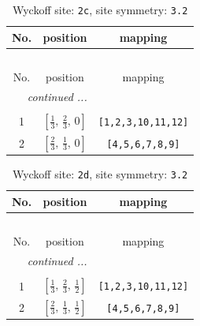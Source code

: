 \documentclass[fleqn,8pt]{jsarticle}
\begin{document}
\begin{longtable}{ccc}
\caption{Wyckoff site: {\tt 2c}, site symmetry: {\tt 3.2}}
 \\
 \hline \hline
No. & position & mapping \\ \hline \endfirsthead

\multicolumn{2}{l}{\tablename\ \thetable{}} \\
 \hline \hline
No. & position & mapping \\ \hline \endhead

 \hline \hline
\multicolumn{2}{r}{\footnotesize\it continued ...} \\ \endfoot

 \hline \hline
\multicolumn{2}{r}{} \\ \endlastfoot

1 & $\left[ \frac{1}{3},\, \frac{2}{3},\, 0 \right]$ & {\tt [1,2,3,10,11,12]} \\ \hline
2 & $\left[ \frac{2}{3},\, \frac{1}{3},\, 0 \right]$ & {\tt [4,5,6,7,8,9]} \\
\end{longtable}
\renewcommand{\arraystretch}{1.2}
\begin{longtable}{ccc}
\caption{Wyckoff site: {\tt 2d}, site symmetry: {\tt 3.2}}
 \\
 \hline \hline
No. & position & mapping \\ \hline \endfirsthead

\multicolumn{2}{l}{\tablename\ \thetable{}} \\
 \hline \hline
No. & position & mapping \\ \hline \endhead

 \hline \hline
\multicolumn{2}{r}{\footnotesize\it continued ...} \\ \endfoot

 \hline \hline
\multicolumn{2}{r}{} \\ \endlastfoot

1 & $\left[ \frac{1}{3},\, \frac{2}{3},\, \frac{1}{2} \right]$ & {\tt [1,2,3,10,11,12]} \\ \hline
2 & $\left[ \frac{2}{3},\, \frac{1}{3},\, \frac{1}{2} \right]$ & {\tt [4,5,6,7,8,9]} \\
\end{longtable}
\renewcommand{\arraystretch}{1.2}
\end{document}
